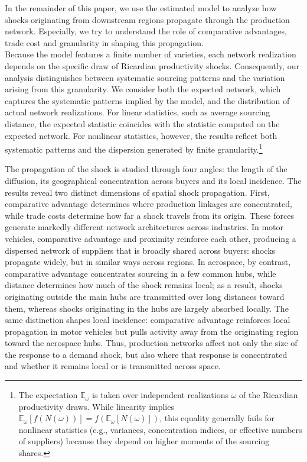 In the remainder of this paper, we use the estimated model to analyze how shocks originating from downstream regions propagate through the production network. Especially, we try to understand the role of comparative advantages, trade cost and granularity in shaping this propagation. \\

Because the model features a finite number of varieties, each network realization depends on the specific draw of Ricardian productivity shocks. Consequently, our analysis distinguishes between systematic sourcing patterns and the variation arising from this granularity. We consider both the expected network, which captures the systematic patterns implied by the model, and the distribution of actual network realizations. For linear statistics, such as average sourcing distance, the expected statistic coincides with the statistic computed on the expected network. For nonlinear statistics, however, the results reflect both systematic patterns and the dispersion generated by finite granularity.\footnote{The expectation $\mathbb{E}_{\omega}$ is taken over independent realizations $\omega$ of the Ricardian productivity draws. While linearity implies $\mathbb{E}_{\omega}[f(N(\omega))]=f(\mathbb{E}_{\omega}[N(\omega)])$, this equality generally fails for nonlinear statistics (e.g., variances, concentration indices, or effective numbers of suppliers) because they depend on higher moments of the sourcing shares.}

The propagation of the shock is studied through four angles: the length of the diffusion, its geographical concentration across buyers and its local incidence. The results reveal two distinct dimensions of spatial shock propagation. First, comparative advantage determines where production linkages are concentrated, while trade costs determine how far a shock travels from its origin. These forces generate markedly different network architectures across industries. In motor vehicles, comparative advantage and proximity reinforce each other, producing a dispersed network of suppliers that is broadly shared across buyers: shocks propagate widely, but in similar ways across regions. In aerospace, by contrast, comparative advantage concentrates sourcing in a few common hubs, while distance determines how much of the shock remains local; as a result, shocks originating outside the main hubs are transmitted over long distances toward them, whereas shocks originating in the hubs are largely absorbed locally. The same distinction shapes local incidence: comparative advantage reinforces local propagation in motor vehicles but pulls activity away from the originating region toward the aerospace hubs. Thus, production networks affect not only the size of the response to a demand shock, but also where that response is concentrated and whether it remains local or is transmitted across space.




